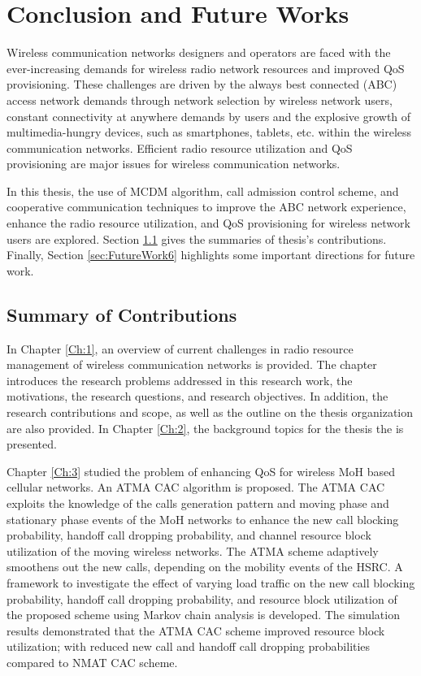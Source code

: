 \chapter{Conclusion and Future Works}\label{Ch:6}
Wireless communication  networks designers and operators are faced with the ever-increasing demands for wireless radio network resources and improved QoS provisioning. These challenges are driven by the always best connected (ABC)  access network  demands through network selection by wireless network users,  constant connectivity at anywhere demands by users and the explosive growth of multimedia-hungry devices, such as smartphones, tablets,  etc. within the wireless communication networks. Efficient radio resource utilization and QoS provisioning are major issues for wireless communication networks. \par 

 In this thesis, the use of MCDM algorithm, call admission control scheme, and cooperative communication techniques to improve the ABC network experience, enhance the radio resource utilization, and QoS provisioning for wireless network users are explored. Section \ref{sec:SummaryofContributions6}  gives the summaries of thesis's contributions. Finally, Section \ref{sec:FutureWork6}  highlights some important directions for future work.
 
\section{Summary of Contributions} \label{sec:SummaryofContributions6}
 In Chapter \ref{Ch:1}, an overview of current  challenges in radio resource management  of wireless communication networks is provided. The chapter introduces the research problems addressed in this research work, the motivations, the research questions, and  research objectives. In addition, the research contributions and scope, as well as the outline on the thesis organization are also provided. In Chapter \ref{Ch:2}, the background topics for the thesis the is presented. \par
 
Chapter \ref{Ch:3}  studied the problem of enhancing QoS for wireless  MoH  based cellular networks. An  ATMA  CAC algorithm is proposed. The ATMA CAC  exploits the knowledge of the  calls generation pattern and  moving phase and stationary phase events of the MoH networks to enhance the new call blocking probability, handoff call dropping probability, and channel resource block utilization of the moving wireless networks. The  ATMA scheme adaptively smoothens out the new calls, depending on the mobility events of the HSRC. A  framework to investigate the effect of varying  load traffic on the new call blocking probability, handoff call dropping probability, and resource block utilization of the proposed scheme  using Markov chain analysis is developed.  The simulation results demonstrated that the ATMA  CAC scheme  improved  resource block utilization; with reduced new call and handoff call dropping probabilities compared to NMAT  CAC scheme.  \par 
 
